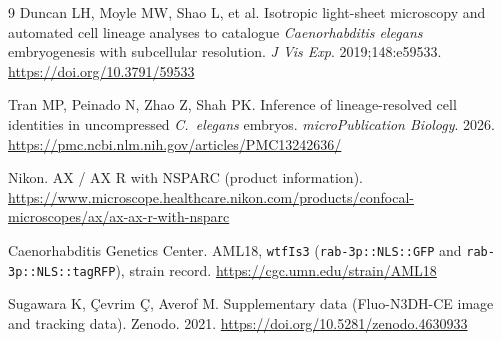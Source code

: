 \documentclass[11pt]{article}
\begin{document}
\begin{thebibliography}{9}
 Duncan LH, Moyle MW, Shao L, et al. Isotropic light-sheet
microscopy and automated cell lineage analyses to catalogue \textit{Caenorhabditis
elegans} embryogenesis with subcellular resolution. \textit{J Vis Exp}.
2019;148:e59533. \url{https://doi.org/10.3791/59533}

 Tran MP, Peinado N, Zhao Z, Shah PK. Inference of
lineage-resolved cell identities in uncompressed \textit{C.\ elegans} embryos.
\textit{microPublication Biology}. 2026.
\url{https://pmc.ncbi.nlm.nih.gov/articles/PMC13242636/}

 Nikon. AX / AX R with NSPARC (product information).
\url{https://www.microscope.healthcare.nikon.com/products/confocal-microscopes/ax/ax-ax-r-with-nsparc}

 Caenorhabditis Genetics Center. AML18, \texttt{wtfIs3}
(\texttt{rab-3p::NLS::GFP} and \texttt{rab-3p::NLS::tagRFP}), strain record.
\url{https://cgc.umn.edu/strain/AML18}

 Sugawara K, \c{C}evrim \c{C}, Averof M. Supplementary data
(Fluo-N3DH-CE image and tracking data). Zenodo. 2021.
\url{https://doi.org/10.5281/zenodo.4630933}
\end{thebibliography}
\end{document}
